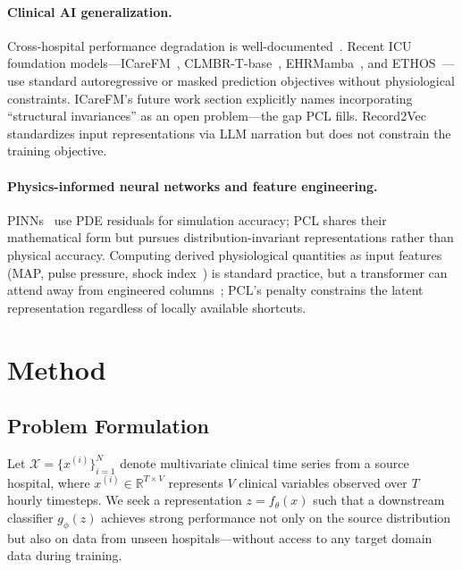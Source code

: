 \documentclass{article}
\begin{document}
\paragraph{Clinical AI generalization.}
Cross-hospital performance degradation is well-documented~\citep{zech2018variable, wong2021external, nestor2019feature}.
Recent ICU foundation models---ICareFM~\citep{icarefm2025}, CLMBR-T-base~\citep{steinberg2024clmbr}, EHRMamba~\citep{ehrmamba2024}, and ETHOS~\citep{ethos2024}---use standard autoregressive or masked prediction objectives without physiological constraints.
ICareFM's future work section explicitly names incorporating ``structural invariances'' as an open problem---the gap PCL fills.
Record2Vec~\citep{record2vec2026} standardizes input representations via LLM narration but does not constrain the training objective.

\paragraph{Physics-informed neural networks and feature engineering.}
PINNs~\citep{raissi2019physics} use PDE residuals for simulation accuracy; PCL shares their mathematical form but pursues distribution-invariant representations rather than physical accuracy.
Computing derived physiological quantities as input features (MAP, pulse pressure, shock index~\citep{vincent2018clinical}) is standard practice, but a transformer can attend away from engineered columns~\citep{grinsztajn2022tree}; PCL's penalty constrains the latent representation regardless of locally available shortcuts.

\section{Method}
\label{sec:method}

\subsection{Problem Formulation}

Let $\mathcal{X} = \{x^{(i)}\}_{i=1}^N$ denote multivariate clinical time series from a source hospital, where $x^{(i)} \in \mathbb{R}^{T \times V}$ represents $V$ clinical variables observed over $T$ hourly timesteps.
We seek a representation $z = f_\theta(x)$ such that a downstream classifier $g_\phi(z)$ achieves strong performance not only on the source distribution but also on data from unseen hospitals---without access to any target domain data during training.
\end{document}
